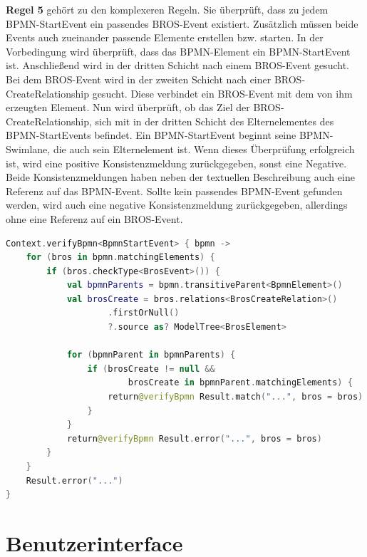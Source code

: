 \textbf{Regel 5} gehört zu den komplexeren Regeln.
Sie überprüft, dass zu jedem BPMN-StartEvent ein passendes BROS-Event existiert.
Zusätzlich müssen beide Events auch zueinander passende Elemente erstellen bzw. starten.
In der Vorbedingung wird überprüft, dass das BPMN-Element ein BPMN-StartEvent ist.
Anschließend wird in der dritten Schicht nach einem BROS-Event gesucht.
Bei dem BROS-Event wird in der zweiten Schicht nach einer BROS-CreateRelationship gesucht.
Diese verbindet ein BROS-Event mit dem von ihm erzeugten Element.
Nun wird überprüft, ob das Ziel der BROS-CreateRelationship, sich mit in der dritten Schicht des Elternelementes des BPMN-StartEvents befindet.
Ein BPMN-StartEvent beginnt seine BPMN-Swimlane, die auch sein Elternelement ist.
Wenn dieses Überprüfung erfolgreich ist, wird eine positive Konsistenzmeldung zurückgegeben, sonst eine Negative.
Beide Konsistenzmeldungen haben neben der textuellen Beschreibung auch eine Referenz auf das BPMN-Event.
Sollte kein passendes BPMN-Event gefunden werden, wird auch eine negative Konsistenzmeldung zurückgegeben, allerdings ohne eine Referenz auf ein BROS-Event.

\begin{lstlisting}[language=Kotlin, caption=Implementierung von Regel 5, label=lst:implementation_rule_5]
Context.verifyBpmn<BpmnStartEvent> { bpmn ->
    for (bros in bpmn.matchingElements) {
        if (bros.checkType<BrosEvent>()) {
            val bpmnParents = bpmn.transitiveParent<BpmnElement>()
            val brosCreate = bros.relations<BrosCreateRelation>()
                    .firstOrNull()
                    ?.source as? ModelTree<BrosElement>

            for (bpmnParent in bpmnParents) {
                if (brosCreate != null && 
                        brosCreate in bpmnParent.matchingElements) {
                    return@verifyBpmn Result.match("...", bros = bros)
                }
            }
            return@verifyBpmn Result.error("...", bros = bros)
        }
    }
    Result.error("...")
}
\end{lstlisting}

\pagebreak
\section{Benutzerinterface}

